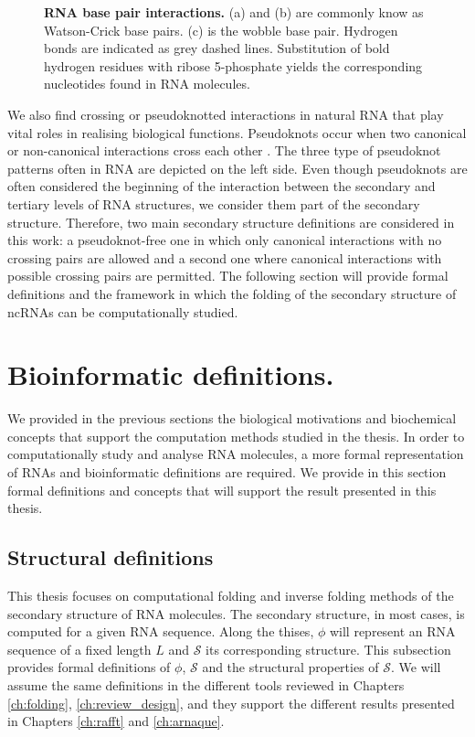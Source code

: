 \begin{figure}
	\caption{\textbf{RNA base pair interactions.} (a) and (b) are commonly know as Watson-Crick base pairs. (c) is the wobble base pair. Hydrogen bonds are indicated as grey dashed lines. Substitution of bold hydrogen residues with ribose 5-phosphate yields the corresponding nucleotides found in RNA molecules.}\label{fig:basepairing}
\end{figure}


We also find crossing or pseudoknotted interactions in natural RNA that play vital roles in realising biological functions. Pseudoknots occur when two canonical or non-canonical interactions cross each other \cite{beyongWCpairs}. The three type of pseudoknot patterns often in RNA are depicted on the left side. Even though pseudoknots are often considered the beginning of the interaction between the secondary and tertiary levels of RNA structures, we consider them part of the secondary structure. Therefore, two main secondary structure definitions are considered in this work: a pseudoknot-free one in which only canonical interactions with no crossing pairs are allowed and a second one where canonical interactions with possible crossing pairs are permitted. The following section will provide formal definitions and the framework in which the folding of the secondary structure of ncRNAs can be computationally studied.

\section{Bioinformatic definitions.}

We provided in the previous sections the biological motivations and biochemical concepts that support the computation methods studied in the thesis. In order to computationally study and analyse RNA molecules, a more formal representation of RNAs and bioinformatic definitions are required. We provide in this section formal definitions and concepts that will support the result presented in this thesis.

\subsection{Structural definitions}
This thesis focuses on computational folding and inverse folding methods of the secondary structure of RNA molecules. The secondary structure, in most cases, is computed for a given RNA sequence. Along the thises, $\phi$ will represent an RNA sequence of a fixed length $L$ and $\mathcal{S}$ its corresponding structure. This subsection provides formal definitions of $\phi$, $\mathcal{S}$ and the structural properties of $\mathcal{S}$. We will assume the same definitions in the different tools reviewed in Chapters \ref{ch:folding}, \ref{ch:review_design}, and they support the different results presented in Chapters \ref{ch:rafft} and \ref{ch:arnaque}.

